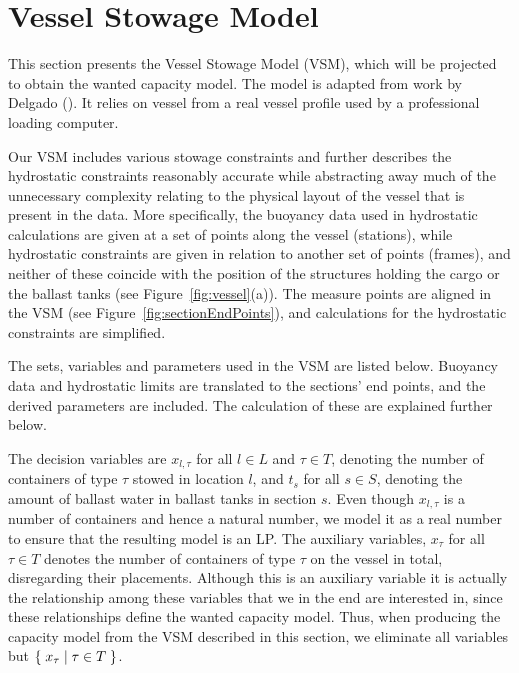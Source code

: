 \section{Vessel Stowage Model}
This section presents the Vessel Stowage Model (VSM), which will be projected to obtain the wanted capacity model. The model is adapted from work by Delgado (\cite{AlbertosThesis}). It relies on vessel from a real vessel profile used by a professional loading computer.   %

Our VSM includes various stowage constraints and further describes the hydrostatic constraints reasonably accurate while abstracting away much of the unnecessary complexity relating to the physical layout of the vessel that is present in the data. 
More specifically, the buoyancy data used in hydrostatic calculations are given at a set of points along the vessel (stations), while hydrostatic constraints are given in relation to another set of points (frames), and neither of these coincide with the position of the structures holding the cargo or the ballast tanks (see Figure~\ref{fig:vessel}(a)). The measure points are aligned in the VSM (see Figure~\ref{fig:sectionEndPoints}), and calculations for the hydrostatic constraints are simplified.

The sets, variables and parameters used in the VSM are listed below.
Buoyancy data and hydrostatic limits are translated to the sections' end points, and the derived parameters are included. The calculation of these are explained further below.

The decision variables are $x_{l,\tau}$ for all $l\in L$ and $\tau \in T$, denoting the number of containers of type $\tau$ stowed in location $l$, and $t_s$ for all $s\in S$, denoting the amount of ballast water in ballast tanks in section $s$. Even though $x_{l,\tau}$ is a number of containers and hence a natural number, we model it as a real number to ensure that the resulting model is an LP. 
The auxiliary variables, $x_\tau$ for all $\tau\in T$ denotes the number of containers of type $\tau$ on the vessel in total, disregarding their placements. Although this is an auxiliary variable it is actually the relationship among these variables that we in the end are interested in, since these relationships define the wanted capacity model. Thus, when producing the capacity model from the VSM described in this section, we eliminate all variables but $\{\;{x_\tau}\;|\;{\tau \in T}\;\}$.  

